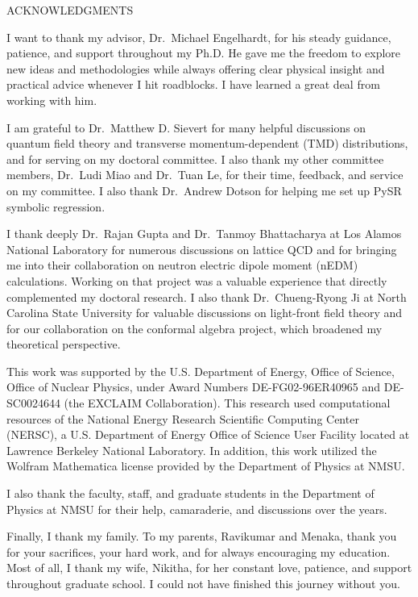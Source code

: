 \begin{center}
ACKNOWLEDGMENTS
\end{center}

I want to thank my advisor, Dr.~Michael Engelhardt, for his steady guidance, patience, and support throughout my Ph.D. He gave me the freedom to explore new ideas and methodologies while always offering clear physical insight and practical advice whenever I hit roadblocks. I have learned a great deal from working with him.

I am grateful to Dr.~Matthew D. Sievert for many helpful discussions on quantum field theory and transverse momentum-dependent (TMD) distributions, and for serving on my doctoral committee. I also thank my other committee members, Dr.~Ludi Miao and Dr.~Tuan Le, for their time, feedback, and service on my committee. I also thank Dr.~Andrew Dotson for helping me set up PySR symbolic regression. 

I thank deeply Dr.~Rajan Gupta and Dr.~Tanmoy Bhattacharya at Los Alamos National Laboratory for numerous discussions on lattice QCD and for bringing me into their collaboration on neutron electric dipole moment (nEDM) calculations. Working on that project was a valuable experience that directly complemented my doctoral research. I also thank Dr.~Chueng-Ryong Ji at North Carolina State University for valuable discussions on light-front field theory and for our collaboration on the conformal algebra project, which broadened my theoretical perspective.

This work was supported by the U.S. Department of Energy, Office of Science, Office of Nuclear Physics, under Award Numbers DE-FG02-96ER40965 and DE-SC0024644 (the EXCLAIM Collaboration). This research used computational resources of the National Energy Research Scientific Computing Center (NERSC), a U.S. Department of Energy Office of Science User Facility located at Lawrence Berkeley National Laboratory. In addition, this work utilized the Wolfram Mathematica license provided by the Department of Physics at NMSU.

I also thank the faculty, staff, and graduate students in the Department of Physics at NMSU for their help, camaraderie, and discussions over the years.

Finally, I thank my family. To my parents, Ravikumar and Menaka, thank you for your sacrifices, your hard work, and for always encouraging my education. Most of all, I thank my wife, Nikitha, for her constant love, patience, and support throughout graduate school. I could not have finished this journey without you.

